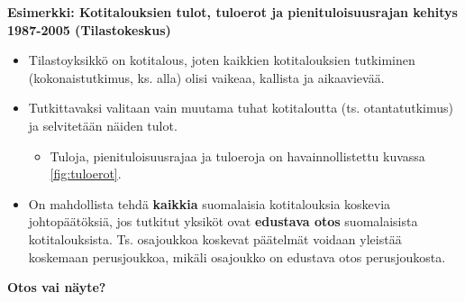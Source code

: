 \documentclass[
]{book}
\providecommand{\tightlist}{%
  \setlength{\itemsep}{0pt}\setlength{\parskip}{0pt}}
\begin{document}
\begin{eblock}{}

\textbf{Esimerkki: Kotitalouksien tulot, tuloerot ja pienituloisuusrajan kehitys 1987-2005 (Tilastokeskus)}

\begin{itemize}
\tightlist
\item
  Tilastoyksikkö on kotitalous, joten kaikkien kotitalouksien tutkiminen (kokonaistutkimus, ks. alla) olisi vaikeaa, kallista ja aikaavievää.
\item
  Tutkittavaksi valitaan vain muutama tuhat kotitaloutta (ts. otantatutkimus) ja selvitetään näiden tulot.

  \begin{itemize}
  \tightlist
  \item
    Tuloja, pienituloisuusrajaa ja tuloeroja on havainnollistettu kuvassa \ref{fig:tuloerot}.
  \end{itemize}
\item
  On mahdollista tehdä \textbf{kaikkia} suomalaisia kotitalouksia koskevia johtopäätöksiä, jos tutkitut yksiköt ovat \textbf{edustava otos} suomalaisista kotitalouksista. Ts. osajoukkoa koskevat päätelmät voidaan yleistää koskemaan perusjoukkoa, mikäli osajoukko on edustava otos perusjoukosta.
\end{itemize}

\end{eblock}

\textbf{Otos vai näyte?}
\end{document}

